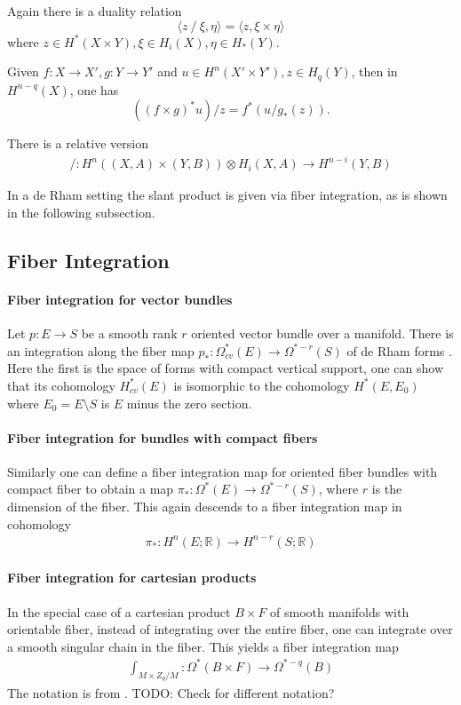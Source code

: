 \documentclass{scrartcl}
\theoremstyle{plain}
\theoremstyle{definition}
\newcommand{\R}{\mathbb R}
\newcommand{\slant}{\mathbin{/}}
\begin{document}
    Again there is a duality relation $$\langle z\slant\xi, \eta\rangle = \langle z, \xi\times \eta\rangle$$ where $z\in H^*(X\times Y), \xi\in H_i(X), \eta\in H_*(Y)$. 

    Given $f\colon X\to X', g\colon Y\to Y'$ and $u\in H^n(X'\times Y'), z\in H_q(Y)$, then in $H^{n-q}(X)$, one has $$((f\times g)^*u)/z = f^*(u/g_*(z)).$$

    There is a relative version 
    \begin{align*}
        \slant\colon H^n((X,A)\times (Y,B))\otimes H_i(X, A) \to H^{n-i}(Y, B)
    \end{align*}

    In a de Rham setting the slant product is given via fiber integration, as is shown in the following subsection. 

    \subsection{Fiber Integration}\label{subsec:fiber_integration}
    
    \paragraph{Fiber integration for vector bundles} Let $p\colon E\to S$ be a smooth rank $r$ oriented vector bundle over a manifold. There is an integration along the fiber map $p_*\colon \Omega^*_{cv}(E) \to \Omega^{*-r}(S)$ of de Rham forms \cite[I.6]{bott1982differential}. Here the first is the space of forms with compact vertical support, one can show that its cohomology $H^*_{cv}(E)$ is isomorphic to the cohomology $H^*(E, E_0)$ where $E_0 = E\setminus S$ is $E$ minus the zero section.

    \paragraph{Fiber integration for bundles with compact fibers} Similarly one can define a fiber integration map for oriented fiber bundles with compact fiber to obtain a map $\pi_*\colon \Omega^*(E) \to \Omega^{*-r}(S)$, where $r$ is the dimension of the fiber. This again descends to a fiber integration map in cohomology 
    \begin{align*}
        \pi_*\colon H^n(E; \R) \to H^{n-r}(S; \R)
    \end{align*}
    
    \paragraph{Fiber integration for cartesian products} In the special case of a cartesian product $B\times F$ of smooth manifolds with orientable fiber, instead of integrating over the entire fiber, one can integrate over a smooth singular chain in the fiber. This yields a fiber integration map 
    \begin{align*}
        \int_{M\times Z_q / M} \colon \Omega^*(B\times F) \to \Omega^{*-q}(B)
    \end{align*}
    The notation is from \cite{hopkins2005quadratic}. TODO: Check for different notation?
    
\end{document}
